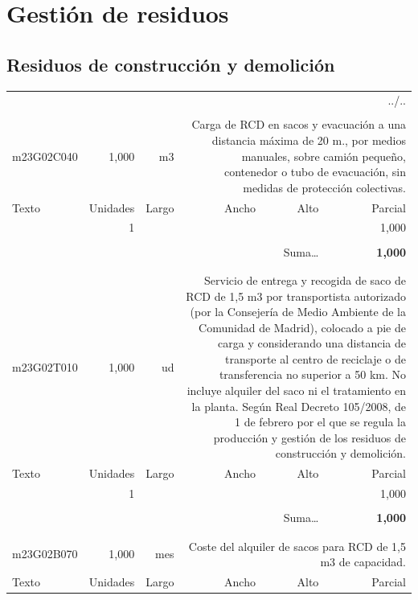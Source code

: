 \documentclass{book}%
\begin{document}
%
\section{Gestión de residuos}%
\subsection{Residuos de construcción y demolición}%
\begin{longtable}{lrrrrr}%
\multicolumn{6}{r}{../..}\\%
\endfoot%
\endlastfoot%
&&&&&\\%
m23G02C040&     1,000& m3&\multicolumn{3}{p{6cm}}{\scriptsize Carga de RCD en sacos y evacuación a una distancia máxima de 20 m., por medios manuales, sobre camión pequeño, contenedor o tubo de evacuación, sin medidas de protección colectivas.\normalsize}\\%
Texto&Unidades&Largo&Ancho&Alto&Parcial\\%
\hline%
\multicolumn{1}{p{3.5cm}}{ }&1&&&&     1,000\\%
&&&&&\\%
\multicolumn{5}{r}{Suma\ldots}&\textbf{     1,000}\\%
\hline%
&&&&&\\%
&&&&&\\%
m23G02T010&     1,000& ud&\multicolumn{3}{p{6cm}}{\scriptsize Servicio de entrega y recogida de saco de RCD de 1,5 m3 por transportista autorizado (por la Consejería de Medio Ambiente de la Comunidad de Madrid), colocado a pie de carga y considerando una distancia de transporte al centro de reciclaje o de transferencia no superior a 50 km. No incluye alquiler del saco ni el tratamiento en la planta. Según Real Decreto 105/2008, de 1 de febrero por el que se regula la producción y gestión de los residuos de construcción y demolición.\normalsize}\\%
Texto&Unidades&Largo&Ancho&Alto&Parcial\\%
\hline%
\multicolumn{1}{p{3.5cm}}{ }&1&&&&     1,000\\%
&&&&&\\%
\multicolumn{5}{r}{Suma\ldots}&\textbf{     1,000}\\%
\hline%
&&&&&\\%
&&&&&\\%
m23G02B070&     1,000& mes&\multicolumn{3}{p{6cm}}{\scriptsize Coste del alquiler de sacos para RCD de 1,5 m3 de capacidad.\normalsize}\\%
Texto&Unidades&Largo&Ancho&Alto&Parcial\\%

\end{longtable}
\end{document}
